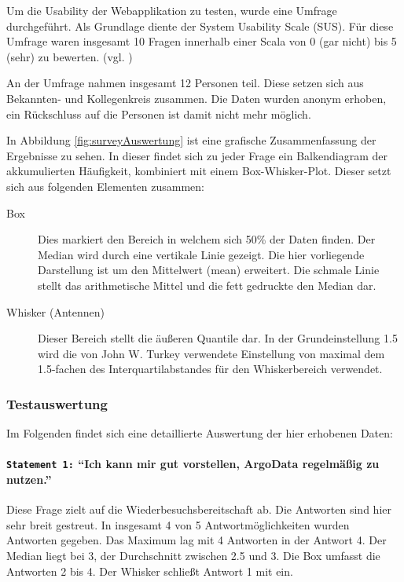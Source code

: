 Um die Usability der Webapplikation zu testen, wurde eine Umfrage durchgeführt. Als Grundlage diente der System Usability Scale (SUS).
Für diese Umfrage waren insgesamt 10 Fragen innerhalb einer Scala von 0 (gar nicht) bis 5 (sehr)  zu bewerten. (vgl. \cite{Quantita52:online})

An der Umfrage nahmen insgesamt 12 Personen teil. Diese setzen sich aus Bekannten- und Kollegenkreis zusammen. Die Daten wurden anonym erhoben, ein Rückschluss auf die Personen ist damit nicht mehr möglich.

In Abbildung \ref{fig:surveyAuswertung}
ist eine grafische Zusammenfassung der Ergebnisse zu sehen. In dieser findet sich zu jeder Frage ein Balkendiagram der akkumulierten Häufigkeit, kombiniert mit einem Box-Whisker-Plot. Dieser setzt sich aus folgenden Elementen zusammen:

\begin{description}
 \item [Box]
    Dies markiert den Bereich in welchem sich 50\% der Daten finden. Der Median wird durch eine vertikale Linie gezeigt. Die hier vorliegende Darstellung ist um den Mittelwert (mean) erweitert. Die schmale Linie stellt das arithmetische Mittel und die fett gedruckte den Median dar.
 \item [Whisker (Antennen)]
    Dieser Bereich stellt die äußeren Quantile dar. In der Grundeinstellung 1.5 wird die von John W. Turkey verwendete Einstellung von maximal dem 1.5-fachen des Interquartilabstandes für den Whiskerbereich verwendet.
\end{description}


\subsubsection{Testauswertung}

Im Folgenden findet sich eine detaillierte Auswertung der hier erhobenen Daten:


\paragraph{\texttt{Statement 1:} "`Ich kann mir gut vorstellen, ArgoData regelmäßig zu nutzen."'}
    Diese Frage zielt auf die Wiederbesuchsbereitschaft ab. Die Antworten sind hier sehr breit gestreut. In insgesamt 4 von 5 Antwortmöglichkeiten wurden Antworten gegeben. Das Maximum lag mit 4 Antworten in der Antwort 4. Der Median liegt bei 3, der Durchschnitt zwischen 2.5 und 3. Die Box umfasst die Antworten 2 bis 4. Der Whisker schließt Antwort 1 mit ein.

